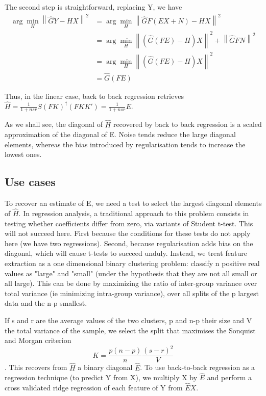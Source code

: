 \documentclass{article}
\begin{document}
The second step is straightforward, replacing Y, we have
\begin{equation}
\begin{aligned}
\arg \min_H \left \| \hat GY - HX \right \|^2 &=\arg  \min_H \left \| \hat GF(EX+N) - HX \right \|^2 \\
&=\arg \min_H \left \| (\hat G(FE)-H)X \right \| ^2 + \left \| \hat GFN \right \| ^2\\
&= \arg \min_H \left \| (\hat G(FE)-H)X \right \| ^2\\
&=\hat G (FE)
\end{aligned}
\end{equation}

Thus, in the linear case, back to back regression retrieves $\hat H = \frac{1}{1+nsr} S (FK)^{\dagger}(FKK') = \frac{1}{1+nsr} E$.


As we shall see, the diagonal of $\hat H$ recovered by back to back regression is a scaled approximation of the diagonal of E. Noise tends reduce the large diagonal elements, whereas the bias introduced by regularisation tends to increase the lowest ones.

\subsection{Use cases}

To recover an estimate of E, we need a test to select the largest diagonal elements of $\hat H$.
%
In regression analysis, a traditional approach to this problem consists in testing whether coefficients differ from zero, via variants of Student t-test.
%
This will not succeed here. First because the conditions for these tests do not apply here (we have two regressions). Second, because regularisation adds bias on the diagonal, which will cause t-tests to succeed unduly.
%
Instead, we treat feature extraction as a one dimensional binary clustering problem: classify n positive real values as "large" and "small" (under the hypothesis that they are not all small or all large). This can be done by maximizing the ratio of inter-group variance over total variance (ie minimizing intra-group variance), over all splits of the p largest data and the n-p smallest. 

If s and r are the average values of the two clusters, p and n-p their size and V the total variance of the sample, we select the split that maximises the Sonquist and Morgan criterion $$K = \frac{p (n-p)}{n} \frac{(s-r)^2}{ V}$$.
%
This recovers from $\hat H$ a binary diagonal $\hat E$.
%
To use back-to-back regression as a regression technique (to predict Y from X), we multiply X by $\hat E$ and perform a cross validated ridge regression of each feature of Y from $\hat E X$.
\end{document}

